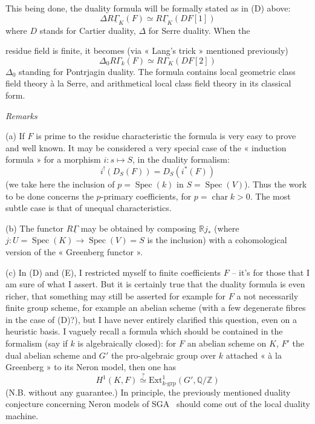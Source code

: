 \documentclass[11pt,a4paper]{article}
\begin{document}
This being done, the duality formula will be formally stated as in (D) above:
\[
\Delta R\underline{\Gamma}_K(F) \simeq R\underline{\Gamma}_K(DF[1])
\]
where $D$ stands for Cartier duality, $\Delta$ for Serre duality. When the

residue field is finite, it becomes (via « Lang's trick » mentioned previously)
\[
\Delta_0 R\Gamma_k(F) \simeq R\Gamma_K(DF[2])
\]
$\Delta_0$ standing for Pontrjagin duality. The formula contains local geometric class field theory à la Serre, and arithmetical local class field theory in its classical form.

\emph{Remarks}

(a) If $F$ is prime to the residue characteristic the formula is very easy to prove and well known. It may be considered a very special case of the « induction formula » for a morphism $i : s \longmapsto S$, in the duality formalism:
\[
i^!(D_S(F)) = D_S(i^*(F))
\]
(we take here the inclusion of $p = \operatorname{Spec}(k)$ in $S = \operatorname{Spec}(V)$). Thus the work to be done concerns the $p$-primary coefficients, for $p = \operatorname{char} k > 0$. The most subtle case is that of unequal characteristics.

(b) The functor $R\underline{\Gamma}$ may be obtained by composing $\mathbb{R}j_*$ (where $j : U = \operatorname{Spec}(K) \longrightarrow \operatorname{Spec}(V) = S$ is the inclusion) with a cohomological version of the « Greenberg functor ».

(c) In (D) and (E), I restricted myself to finite coefficients $F$ -- it's for those that I am sure of what I assert. But it is certainly true that the duality formula is even richer, that something may still be asserted for example for $F$ a not necessarily finite group scheme, for example an abelian scheme (with a few degenerate fibres in the case of (D)?), but I have never entirely clarified this question, even on a heuristic basis. I vaguely recall a formula which should be contained in the formalism (say if $k$ is algebraically closed): for $F$ an abelian scheme on $K$, $F'$ the dual abelian scheme and $G'$ the pro-algebraic group over $k$ attached « à la Greenberg » to its Neron model, then one has
\[
H^1(K, F) \overset{?}{\simeq} \mathrm{Ext}^1_{k\text{-grp}}(G', \mathbb{Q}/\mathbb{Z})
\]
(N.B. without any guarantee.) In principle, the previously mentioned duality conjecture concerning Neron models of SGA~ should come out of the local duality machine.
\end{document}
